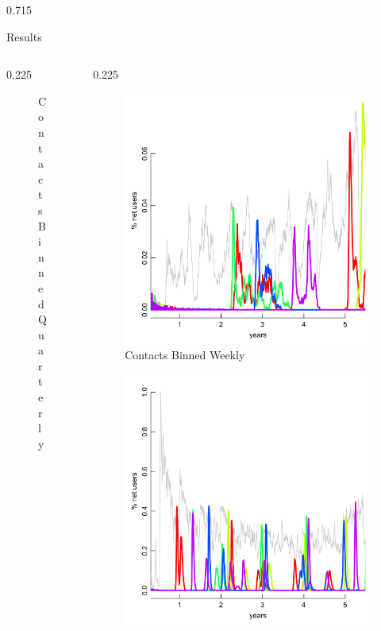 \documentclass[final]{beamer} %
\newcommand{\spaceProp}{0.02}
\newcommand{\spacer}{\begin{column}{\spaceProp\paperwidth}\end{column}}
\newenvironment{oneCol}{\begin{column}[t]{0.225\paperwidth}}{\end{column}}
\newenvironment{threeCol}{\begin{column}[t]{0.715\paperwidth}}{\end{column}}
\begin{document}
\begin{frame}{}
\begin{columns}[t]
\begin{threeCol}
\begin{block}{Results}
\begin{columns}
\begin{oneCol}
\begin{figure}
        \caption{Contacts Binned Quarterly}
      \end{figure}  
    \end{oneCol}
    \begin{oneCol}
      \setcounter{figure}{1}
      \begin{figure}
        \caption{Contacts Binned Weekly}
        \includegraphics[width=1.0\linewidth]{out7.png}
      \end{figure}
      \setcounter{figure}{4}
      \begin{figure}
        \includegraphics[width=1.0\linewidth]{out180.png}

\end{figure}
\end{oneCol}
\end{columns}
\end{block}
\end{threeCol}
\end{columns}
\end{frame}
\end{document}
